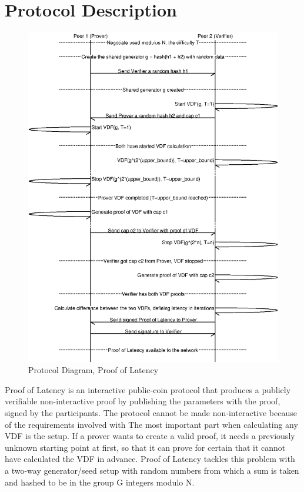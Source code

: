 \section{Protocol Description}
\begin{figure}
	\includegraphics[width=\textwidth]{pictures/pol2_diagram.eps}
	\caption{Protocol Diagram, Proof of Latency}
	\label{PoL Diagram 2}
\end{figure}
Proof of Latency is an interactive public-coin protocol that produces a publicly verifiable non-interactive proof by publishing the parameters with the proof, signed by the participants. The protocol cannot be made non-interactive because of the requirements involved with
The most important part when calculating any VDF is the setup. If a prover wants to create a valid proof, it needs a previously unknown starting point at first, so that it can prove for certain that it cannot have calculated the VDF in advance. Proof of Latency tackles this problem with a two-way generator/seed setup with random numbers from which a sum is taken and hashed to be in the group G integers modulo N.

